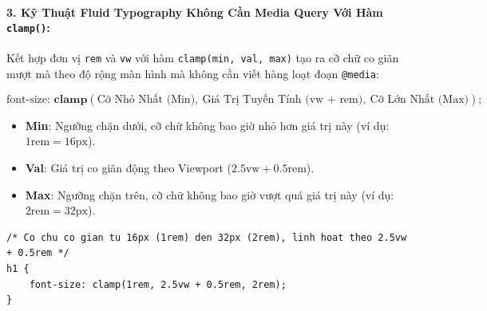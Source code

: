 \documentclass[11pt,oneside]{book}
\newcommand{\codeinline}[1]{\textcolor{accentOrange}{\texttt{#1}}}
\begin{document}
\paragraph{3. Kỹ Thuật Fluid Typography Không Cần Media Query Với Hàm \codeinline{clamp()}:}
Kết hợp đơn vị \codeinline{rem} và \codeinline{vw} với hàm \codeinline{clamp(min, val, max)} tạo ra cỡ chữ co giãn mượt mà theo độ rộng màn hình mà không cần viết hàng loạt đoạn \codeinline{@media}:

\begin{conceptBox}
\[
\text{font-size: } \mathbf{\text{clamp}}(\text{Cỡ Nhỏ Nhất (Min)}, \ \text{Giá Trị Tuyến Tính (vw + rem)}, \ \text{Cỡ Lớn Nhất (Max)});
\]
\begin{itemize}[leftmargin=1.5em, itemsep=2pt, parsep=0pt]
    \item \textbf{Min}: Ngưỡng chặn dưới, cỡ chữ không bao giờ nhỏ hơn giá trị này (ví dụ: $1\text{rem} = 16\text{px}$).
    \item \textbf{Val}: Giá trị co giãn động theo Viewport ($2.5\text{vw} + 0.5\text{rem}$).
    \item \textbf{Max}: Ngưỡng chặn trên, cỡ chữ không bao giờ vượt quá giá trị này (ví dụ: $2\text{rem} = 32\text{px}$).
\end{itemize}
\end{conceptBox}

\begin{codeWindow}
\begin{lstlisting}[language=CSS3]
/* Co chu co gian tu 16px (1rem) den 32px (2rem), linh hoat theo 2.5vw + 0.5rem */
h1 {
    font-size: clamp(1rem, 2.5vw + 0.5rem, 2rem);
}
\end{lstlisting}
\end{codeWindow}
\end{document}
